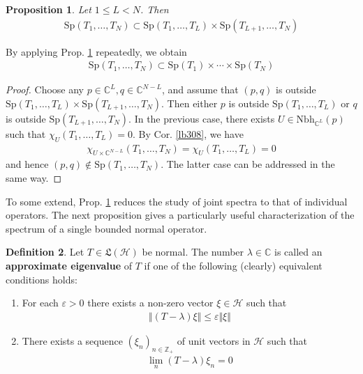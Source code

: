 \documentclass[12pt,b5paper,notitlepage]{article}
\theoremstyle{definition}
\newtheorem{df}{Definition}[subsection]
\theoremstyle{plain}
\newtheorem{pp}[df]{Proposition}
\newcommand{\fk}{\mathfrak}
\newcommand{\Cbb}{\mathbb C}
\newcommand{\Zbb}{\mathbb Z}
\newcommand{\Sp}{\mathrm{Sp}}
\newcommand{\Nbh}{\mathrm{Nbh}}
\newcommand{\eps}{\varepsilon}
\newcommand{\MH}{\mathcal H}
\numberwithin{equation}{section}
\begin{document}
\begin{pp}\label{lb307}
Let $1\leq L<N$. Then
\begin{align}
\Sp(T_1,\dots,T_N)\subset\Sp(T_1,\dots,T_L)\times\Sp(T_{L+1},\dots,T_N)
\end{align}
\end{pp}

By applying Prop. \ref{lb307} repeatedly, we obtain
\begin{align*}
\Sp(T_1,\dots,T_N)\subset\Sp(T_1)\times\cdots\times\Sp(T_N)
\end{align*}


\begin{proof}
Choose any $p\in\Cbb^L,q\in\Cbb^{N-L}$, and assume that $(p,q)$ is outside $\Sp(T_1,\dots,T_L)\times\Sp(T_{L+1},\dots,T_N)$. Then either $p$ is outside $\Sp(T_1,\dots,T_L)$ or $q$ is outside $\Sp(T_{L+1},\dots,T_N)$. In the previous case, there exists $U\in\Nbh_{\Cbb^L}(p)$ such that $\chi_U(T_1,\dots,T_L)=0$. By Cor. \ref{lb308}, we have
\begin{align*}
\chi_{U\times\Cbb^{N-L}}(T_1,\dots,T_N)=\chi_U(T_1,\dots,T_L)=0
\end{align*}
and hence $(p,q)\notin\Sp(T_1,\dots,T_N)$. The latter case can be addressed in the same way.
\end{proof}





To some extend, Prop. \ref{lb307} reduces the study of joint spectra to that of individual operators. The next proposition gives a particularly useful characterization of the spectrum of a single bounded normal operator.

\begin{df}
Let $T\in\fk L(\MH)$ be normal. The number $\lambda\in\Cbb$ is called an \textbf{approximate eigenvalue}  of $T$ if one of the following (clearly) equivalent conditions holds:
\begin{enumerate}
\item[(1)] For each $\eps>0$ there exists a non-zero vector $\xi\in\MH$ such that
\begin{align*}
\Vert (T-\lambda)\xi\Vert\leq\eps\Vert\xi\Vert
\end{align*}
\item[(2)] There exists a sequence $(\xi_n)_{n\in\Zbb_+}$ of unit vectors in $\MH$ such that
\begin{align*}
\lim_n (T-\lambda)\xi_n=0
\end{align*}
\end{enumerate}
\end{df}
\end{document}
